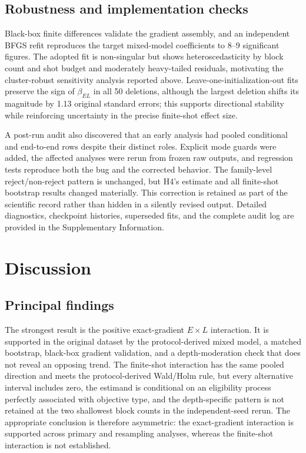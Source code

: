 \documentclass[pdflatex,sn-basic,Numbered]{sn-jnl}
\begin{document}
\subsection{Robustness and implementation checks}\label{sec:results-robustness}

Black-box finite differences validate the gradient assembly, and an independent BFGS refit reproduces the target mixed-model coefficients to 8--9 significant figures. The adopted fit is non-singular but shows heteroscedasticity by block count and shot budget and moderately heavy-tailed residuals, motivating the cluster-robust sensitivity analysis reported above. Leave-one-initialization-out fits preserve the sign of $\beta_{EL}$ in all 50 deletions, although the largest deletion shifts its magnitude by 1.13 original standard errors; this supports directional stability while reinforcing uncertainty in the precise finite-shot effect size.

A post-run audit also discovered that an early analysis had pooled conditional and end-to-end rows despite their distinct roles. Explicit mode guards were added, the affected analyses were rerun from frozen raw outputs, and regression tests reproduce both the bug and the corrected behavior. The family-level reject/non-reject pattern is unchanged, but H4's estimate and all finite-shot bootstrap results changed materially. This correction is retained as part of the scientific record rather than hidden in a silently revised output. Detailed diagnostics, checkpoint histories, superseded fits, and the complete audit log are provided in the Supplementary Information.

\section{Discussion}

\subsection{Principal findings}

The strongest result is the positive exact-gradient $E\times L$ interaction. It is supported in the original dataset by the protocol-derived mixed model, a matched bootstrap, black-box gradient validation, and a depth-moderation check that does not reveal an opposing trend. The finite-shot interaction has the same pooled direction and meets the protocol-derived Wald/Holm rule, but every alternative interval includes zero, the estimand is conditional on an eligibility process perfectly associated with objective type, and the depth-specific pattern is not retained at the two shallowest block counts in the independent-seed rerun. The appropriate conclusion is therefore asymmetric: the exact-gradient interaction is supported across primary and resampling analyses, whereas the finite-shot interaction is not established.
\end{document}
